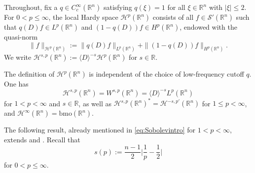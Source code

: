 \documentclass{amsart}
\newcommand {\bmo}{\mathrm{bmo}}
\newcommand {\HT}{\mathcal{H}}
\newcommand {\rb}{\rangle}
\newcommand {\lb}{\langle}
\newcommand {\R}{\mathbb R}
\newcommand {\Rn}{\mathbb{R}^{n}}
\newcommand {\Sw}{\mathcal{S}}
\theoremstyle{definition}
\newtheorem{definition}[theorem]{Definition}
\numberwithin{equation}{section}
\begin{document}
Throughout, fix a $q\in C^{\infty}_{c}(\Rn)$ satisfying $q(\xi)=1$ for all $\xi\in\Rn$ with $|\xi|\leq 2$. 
For $0<p\leq \infty$, the local Hardy space $\HT^{p}(\Rn)$ consists of all $f\in\Sw'(\Rn)$ such that $q(D)f\in L^{p}(\Rn)$ and $(1-q(D))f\in H^{p}(\Rn)$, endowed with the quasi-norm
\[
\|f\|_{\HT^{p}(\Rn)}:=\|q(D)f\|_{L^{p}(\Rn)}+\|(1-q(D))f\|_{H^{p}(\Rn)}.
\]
We write $\HT^{s,p}(\Rn):=\lb D\rb^{-s}\HT^{p}(\Rn)$ for $s\in\R$.


The definition of $\HT^{p}(\Rn)$ is independent of the choice of low-frequency cutoff $q$. One has 
\[
\HT^{s,p}(\Rn)=W^{s,p}(\Rn)=\lb D\rb^{-s}L^{p}(\Rn)
\]
for $1<p<\infty$ and $s\in\R$, as well as $\HT^{s,p}(\Rn)^{*}=\HT^{-s,p'}(\Rn)$ for $1\leq p<\infty$, and $\HT^{\infty}(\Rn)=\bmo(\Rn)$.






The following result, already mentioned in \eqref{eq:Sobolevintro} for $1<p<\infty$, extends \cite[Theorem 4.2]{Smith98a} and \cite[Theorem 7.4]{HaPoRo20}. %
Recall that 
\[
s(p):=\frac{n-1}{2}\Big|\frac{1}{p}-\frac{1}{2}\Big|
\]
 for $0<p\leq \infty$.
\end{document}
